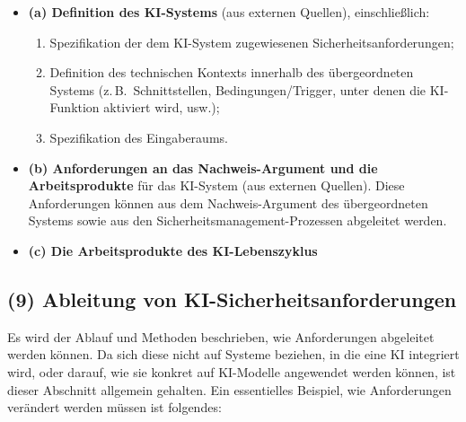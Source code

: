 \begin{itemize}
  \item \textbf{(a) Definition des KI-Systems} (aus externen Quellen), einschließlich:
    \begin{enumerate}[label=\arabic*)]
      \item Spezifikation der dem KI-System zugewiesenen Sicherheitsanforderungen;
      \item Definition des technischen Kontexts innerhalb des übergeordneten Systems (z.\,B.\ Schnittstellen, Bedingungen/Trigger, unter denen die KI-Funktion aktiviert wird, usw.);
      \item Spezifikation des Eingaberaums.
    \end{enumerate}
  \item \textbf{(b) Anforderungen an das Nachweis-Argument und die Arbeitsprodukte} für das KI-System (aus externen Quellen). Diese Anforderungen können aus dem Nachweis-Argument des übergeordneten Systems sowie aus den Sicherheitsmanagement-Prozessen abgeleitet werden.
  \item \textbf{(c) Die Arbeitsprodukte des KI-Lebenszyklus}
\end{itemize}

\subsection{(9) Ableitung von KI-Sicherheitsanforderungen}
Es wird der Ablauf und Methoden beschrieben, wie Anforderungen abgeleitet werden können. 
Da sich diese nicht auf Systeme beziehen, in die eine KI integriert wird, oder darauf, 
wie sie konkret auf KI-Modelle angewendet werden können, ist dieser Abschnitt allgemein gehalten. 
Ein essentielles Beispiel, wie Anforderungen verändert werden müssen ist folgendes:

